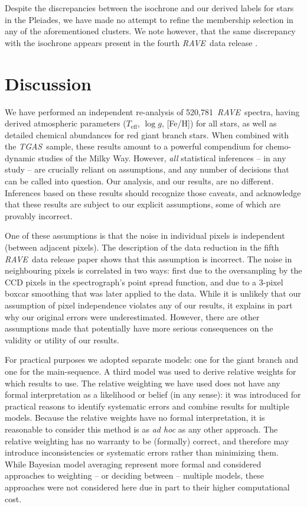 \documentclass[preprint]{aastex61}
\newcommand{\acronym}[1]{{\small{#1}}}
\newcommand{\project}[1]{\textsl{#1}}
\newcommand{\rave}{\project{\acronym{RAVE}}}
\newcommand{\tgas}{\project{\acronym{TGAS}}}
\newcommand{\teff}{T_{\mathrm{eff}}}
\newcommand{\logg}{\log g}
\newcommand{\Nspectra}{520,781}
\begin{document}
Despite the discrepancies between the isochrone and our derived labels for stars
in the Pleiades, we have made no attempt to refine the membership selection in
any of the aforementioned clusters.  We note however, that the same discrepancy
with the isochrone appears present in the fourth \rave\ data release \citet{Kordopatis_2013}.


\section{Discussion}
\label{sec:discussion}


We have performed an independent re-analysis of \Nspectra\ \rave\ spectra,
having derived atmospheric parameters ($\teff$, $\logg$, [Fe/H]) for all stars,
as well as detailed chemical abundances for red giant branch stars.  When 
combined with the \tgas\ sample, these results amount to a powerful compendium 
for chemo-dynamic studies of the Milky Way.  However, \emph{all} statistical 
inferences -- in any study -- are crucially reliant on assumptions, and any 
number of decisions that can be called into question. Our analysis, and our
results, are no different. 
Inferences based on these results should recognize those caveats, and acknowledge
that these results are subject to our explicit assumptions, some of which are 
provably incorrect.


One of these assumptions is that the noise in individual pixels is independent
(between adjacent pixels). The description of the data reduction in the fifth 
\rave\ data release paper \citep{Kunder_2016} shows that this assumption is
incorrect.  The noise in neighbouring pixels is correlated in two ways: first
due to the oversampling by the CCD pixels in the spectrograph's point spread
function, and due to a 3-pixel boxcar smoothing that was later applied
to the data.  While it is unlikely that our assumption of pixel independence
violates any of our results, it explains in part why our original errors were
underestimated.  However, there are other assumptions made that potentially
have more serious consequences on the validity or utility of our results.


For practical purposes we adopted separate models: one for the giant branch and one
for the main-sequence.  A third model was used to derive relative weights for which
results to use.  The relative weighting we have used does not have any formal
interpretation as a likelihood or belief (in any sense): it was introduced for
practical reasons to identify systematic errors and combine results for multiple
models.  Because the relative weights have no formal interpretation, it is reasonable
to consider this method is as \emph{ad hoc} as any other approach.  The relative 
weighting has no warranty to be (formally) correct, and therefore may introduce 
inconsistencies or systematic errors rather than minimizing them.  While Bayesian
model averaging \citep[e.g., ][and similar methods]{Hoeting_1999} represent more
formal and considered approaches to weighting -- or deciding between -- multiple 
models, these approaches were not considered here due in part to their higher 
computational cost.
\end{document}
